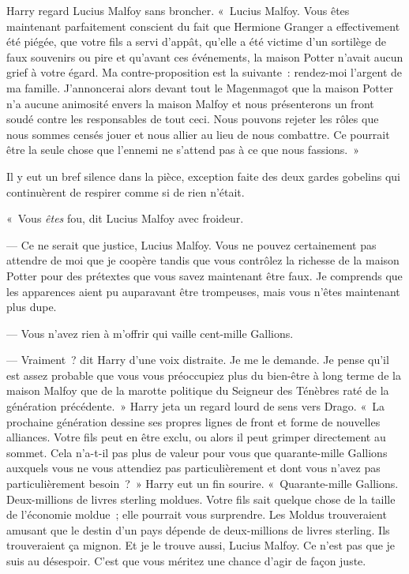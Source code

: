 Harry regard Lucius Malfoy sans broncher. «~Lucius Malfoy. Vous êtes maintenant parfaitement conscient du fait que Hermione Granger a effectivement été piégée, que votre fils a servi d'appât, qu'elle a été victime d'un sortilège de faux souvenirs ou pire et qu'avant ces événements, la maison Potter n'avait aucun grief à votre égard. Ma contre-proposition est la suivante~: rendez-moi l'argent de ma famille. J'annoncerai alors devant tout le Magenmagot que la maison Potter n'a aucune animosité envers la maison Malfoy et nous présenterons un front soudé contre les responsables de tout ceci. Nous pouvons rejeter les rôles que nous sommes censés jouer et nous allier au lieu de nous combattre. Ce pourrait être la seule chose que l'ennemi ne s'attend pas à ce que nous fassions.~»

Il y eut un bref silence dans la pièce, exception faite des deux gardes gobelins qui continuèrent de respirer comme si de rien n'était.

«~Vous \emph{êtes} fou, dit Lucius Malfoy avec froideur.

--- Ce ne serait que justice, Lucius Malfoy. Vous ne pouvez certainement pas attendre de moi que je coopère tandis que vous contrôlez la richesse de la maison Potter pour des prétextes que vous savez maintenant être faux. Je comprends que les apparences aient pu auparavant être trompeuses, mais vous n'êtes maintenant plus dupe.

--- Vous n'avez rien à m'offrir qui vaille cent-mille Gallions.

--- Vraiment~? dit Harry d'une voix distraite. Je me le demande. Je pense qu'il est assez probable que vous vous préoccupiez plus du bien-être à long terme de la maison Malfoy que de la marotte politique du Seigneur des Ténèbres raté de la génération précédente.~» Harry jeta un regard lourd de sens vers Drago. «~La prochaine génération dessine ses propres lignes de front et forme de nouvelles alliances. Votre fils peut en être exclu, ou alors il peut grimper directement au sommet. Cela n'a-t-il pas plus de valeur pour vous que quarante-mille Gallions auxquels vous ne vous attendiez pas particulièrement et dont vous n'avez pas particulièrement besoin~?~» Harry eut un fin sourire. «~Quarante-mille Gallions. Deux-millions de livres sterling moldues. Votre fils sait quelque chose de la taille de l'économie moldue~; elle pourrait vous surprendre. Les Moldus trouveraient amusant que le destin d'un pays dépende de deux-millions de livres sterling. Ils trouveraient ça mignon. Et je le trouve aussi, Lucius Malfoy. Ce n'est pas que je suis au désespoir. C'est que vous méritez une chance d'agir de façon juste.

